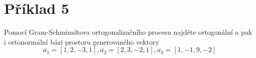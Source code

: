 \section*{Příklad 5}
Pomocí Gram-Schmimdtova ortogonalizačního procesu najděte ortogonální a pak i ortonormální bázi prostoru generovaného vektory
$$ \overline{a_1} = [1, 2, -3, 1], \overline{a_2} = [2,3, -2, 1], \overline{a_3} = [1, -1, 9, -2] $$
